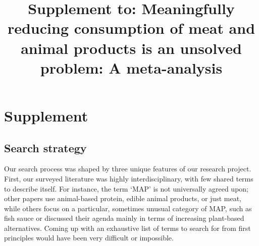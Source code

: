 \documentclass[sn-nature,referee,pdflatex]{sn-jnl}
\begin{document}
\title[MAP-reduction-supplement]{Supplement to: Meaningfully reducing
consumption of meat and animal products is an unsolved problem: A
meta-analysis}


\author*[1]{  }

\author[1]{  }

\author[2]{  }




\abstract{}




\maketitle

\section{Supplement}\label{supplement}

\subsection{Search strategy}\label{search-strategy}

Our search process was shaped by three unique features of our research
project. First, our surveyed literature was highly interdisciplinary,
with few shared terms to describe itself. For instance, the term `MAP'
is not universally agreed upon; other papers use animal-based protein,
edible animal products, or just meat, while others focus on a
particular, sometimes unusual category of MAP, such as fish sauce
\citep{kanchanachitra2020} or discussed their agenda mainly in terms of
increasing plant-based alternatives. Coming up with an exhaustive list
of terms to search for from first principles would have been very
difficult or impossible.
\end{document}
